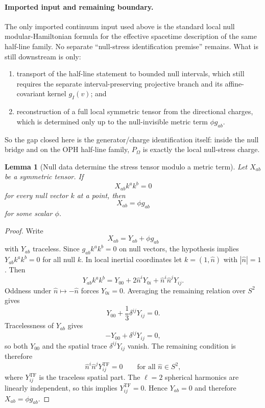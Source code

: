 \documentclass[11pt]{article}
\newtheorem{lemma}[theorem]{Lemma}
\begin{document}
\paragraph{Imported input and remaining boundary.}
The only imported continuum input used above is the standard local null modular-Hamiltonian formula for the effective spacetime description of the same half-line family. No separate ``null-stress identification premise'' remains. What is still downstream is only:
\begin{enumerate}[label=(\roman*),leftmargin=2.2em]
\item transport of the half-line statement to bounded null intervals, which still requires the separate interval-preserving projective branch and its affine-covariant kernel \(g_I(v)\); and
\item reconstruction of a full local symmetric tensor from the directional charges, which is determined only up to the null-invisible metric term \(\phi g_{ab}\).
\end{enumerate}
So the gap closed here is the generator/charge identification itself: inside the null bridge and on the OPH half-line family, \(P_\Omega\) is exactly the local null-stress charge.

\begin{lemma}[Null data determine the stress tensor modulo a metric term]\label{lem:nullreconstruct}
Let \(X_{ab}\) be a symmetric tensor. If
\[
X_{ab}k^ak^b=0
\]
for every null vector \(k\) at a point, then
\[
X_{ab}=\phi g_{ab}
\]
for some scalar \(\phi\).
\end{lemma}

\begin{proof}
Write
\[
X_{ab}=Y_{ab}+\phi g_{ab}
\]
with \(Y_{ab}\) traceless. Since \(g_{ab}k^ak^b=0\) on null vectors, the hypothesis implies \(Y_{ab}k^ak^b=0\) for all null \(k\). In local inertial coordinates let \(k=(1,\hat n)\) with \(|\hat n|=1\). Then
\[
Y_{ab}k^ak^b
=
Y_{00}+2\hat n^iY_{0i}+\hat n^i\hat n^jY_{ij}.
\]
Oddness under \(\hat n\mapsto-\hat n\) forces \(Y_{0i}=0\). Averaging the remaining relation over \(S^2\) gives
\[
Y_{00}+\frac13\delta^{ij}Y_{ij}=0.
\]
Tracelessness of \(Y_{ab}\) gives
\[
-Y_{00}+\delta^{ij}Y_{ij}=0,
\]
so both \(Y_{00}\) and the spatial trace \(\delta^{ij}Y_{ij}\) vanish. The remaining condition is therefore
\[
\hat n^i\hat n^j Y_{ij}^{\mathrm{TF}}=0
\qquad
\text{for all }\hat n\in S^2,
\]
where \(Y_{ij}^{\mathrm{TF}}\) is the traceless spatial part. The \(\ell=2\) spherical harmonics are linearly independent, so this implies \(Y_{ij}^{\mathrm{TF}}=0\). Hence \(Y_{ab}=0\) and therefore \(X_{ab}=\phi g_{ab}\).
\end{proof}
\end{document}
